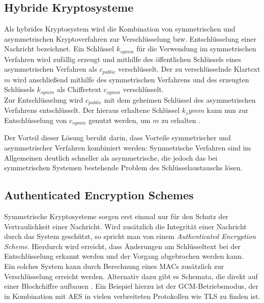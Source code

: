 \subsection{Hybride Kryptosysteme}

\label{sec_basics_hybrid}

Als hybrides Kryptosystem wird die Kombination von symmetrischen und asymmetrischen Kryptoverfahren zur Verschlüsselung bzw. Entschlüsselung einer Nachricht bezeichnet. Ein Schlüssel \(k_{symm}\) für die Verwendung im symmetrischen Verfahren wird zufällig erzeugt und mithilfe des öffentlichen Schlüssels eines asymmetrischen Verfahren als \(c_{public}\) verschlüsselt. Der zu verschlüsselnde Klartext \(m\) wird anschließend mithilfe des symmetrischen Verfahrens und des erzeugten Schlüssels \(k_{symm}\) als Chiffretext \(c_{symm}\) verschlüsselt. \\
Zur Entschlüsselung wird \(c_{public}\) mit dem geheimen Schlüssel des asymmetrischen Verfahrens entschlüsselt. Der hieraus erhaltene Schlüssel \(k_symm\) kann nun zur Entschlüsselung von \(c_{symm}\) genutzt werden, um \(m\) zu erhalten \cite{katz2014}.

Der Vorteil dieser Lösung beruht darin, dass Vorteile symmetrischer und asymmetrischer Verfahren kombiniert werden: Symmetrische Verfahren sind im Allgemeinen deutlich schneller als asymmetrische, die jedoch das bei symmetrischen Systemen bestehende Problem des Schlüsselaustauschs lösen.

\subsection{Authenticated Encryption Schemes}

\label{sec_basics_ae}

Symmetrische Kryptosysteme sorgen erst einmal nur für den Schutz der Vertraulichkeit einer Nachricht. Wird zusätzlich die Integrität einer Nachricht durch das System geschützt, so spricht man von einem \textit{Authenticated Encryption Scheme}. Hierdurch wird erreicht, dass Änderungen am Schlüsseltext bei der Entschlüsselung erkannt werden und der Vorgang abgebrochen werden kann.\\
Ein solches System kann durch Berechnung eines MACs zusätzlich zur Verschlüsselung erreicht werden. Alternativ dazu gibt es Schemata, die direkt auf einer Blockchiffre aufbauen \cite{boneh2016}. Ein Beispiel hierzu ist der GCM-Betriebsmodus, der in Kombination mit AES in vielen verbreiteten Protokollen wie TLS zu finden ist.


